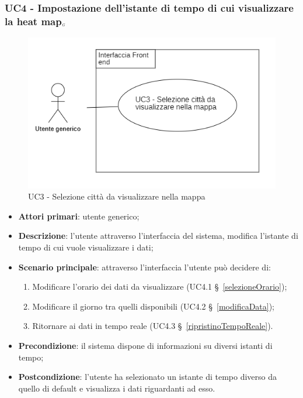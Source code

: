 \subsubsection{UC4 - Impostazione dell’istante di tempo di cui visualizzare la heat map$_{\scaleto{G}{3pt}}$
} \label{impostazioneIstanteTempo}%
\begin{center}
	\begin{figure}[H]
		\includegraphics{../immagini/attori_casi/uc3.png}
		\caption{UC3 - Selezione città da visualizzare nella mappa}
	\end{figure}
\end{center}
\begin{itemize}
	\item \textbf{Attori primari}: utente generico;
	\item \textbf{Descrizione}: l’utente attraverso l’interfaccia del sistema, modifica l’istante di tempo di cui vuole visualizzare i dati;
	\item \textbf{Scenario principale}: attraverso l’interfaccia l’utente può decidere di:
		\begin{enumerate}
			\item Modificare l’orario dei dati da visualizzare (UC4.1 \S~\ref{selezioneOrario});
			\item Modificare il giorno tra quelli disponibili (UC4.2 \S~\ref{modificaData});
			\item Ritornare ai dati in tempo reale (UC4.3 \S~\ref{ripristinoTempoReale}).
		\end{enumerate}
	\item \textbf{Precondizione}: il sistema dispone di informazioni su diversi istanti di tempo;
	\item \textbf{Postcondizione}: l’utente ha selezionato un istante di tempo diverso da quello di default e visualizza i dati riguardanti ad esso.%
\end{itemize}

